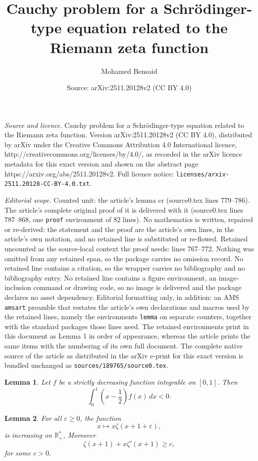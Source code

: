 \documentclass[10pt,a4paper]{amsart}
\title{Cauchy problem for a Schr\"odinger-type equation related to the Riemann zeta function}
\author{Mohamed Bensaid}
\date{Source: arXiv:2511.20128v2 (CC BY 4.0)}
\newtheorem{lemma}{Lemma}
\begin{document}
\maketitle

\noindent\emph{Source and licence.} Cauchy problem for a Schr\"odinger-type equation related to the Riemann zeta function. Version arXiv:2511.20128v2 (CC BY 4.0), distributed by arXiv under the Creative Commons Attribution 4.0 International licence, http://creativecommons.org/licenses/by/4.0/, as recorded in the arXiv licence metadata for this exact version and shown on the abstract page https://arxiv.org/abs/2511.20128v2. Full licence notice: \texttt{licenses/arxiv-2511.20128-CC-BY-4.0.txt}.\par\smallskip

\noindent\textit{Editorial scope.} Counted unit: the article's lemma cr (source0.tex lines 779--786). The article's complete original proof of it is delivered with it (source0.tex lines 787--868, one \texttt{proof} environment of 82 lines). No mathematics is written, repaired or re-derived: the statement and the proof are the article's own lines, in the article's own notation, and no retained line is substituted or re-flowed.  Retained uncounted as the source-local context the proof needs: lines 767--772.  Nothing was omitted from any retained span, so the package carries no omission record.  No retained line contains a citation, so the wrapper carries no bibliography and no bibliography entry.  No retained line contains a figure environment, an image-inclusion command or drawing code, so no image is delivered and the package declares no asset dependency.  Editorial formatting only, in addition: an AMS \texttt{amsart} preamble that restates the article's own declarations and macros used by the retained lines, namely the environments \texttt{lemma} on separate counters, together with the standard packages those lines need.  The retained environments print in this document as Lemma 1 in order of appearance, whereas the article prints the same items with the numbering of its own full document.  The complete native source of the article as distributed in the arXiv e-print for this exact version is bundled unchanged as \texttt{sources/189765/source0.tex}.
\begin{lemma}\label{mo}
    Let $f$ be a strictly decreasing function integrable on $[0,1]$. Then
\[
\int_0^1 \left(x - \frac{1}{2}\right) f(x)\,dx < 0.
\]
\end{lemma}

\begin{lemma}\label{cr}
For all $\varepsilon \ge 0$, the function
\[
x \mapsto x \zeta(x+1+\varepsilon),
\]
is increasing on $\mathbb{R}_{+}^*$, Moreover $$\zeta(x+1)+x\zeta'(x+1)\geq c,$$
for some $c>0.$
\end{lemma}
\end{document}
